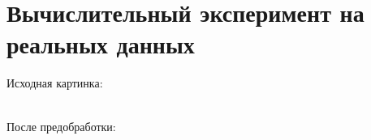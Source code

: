\section{Вычислительный эксперимент на реальных данных}
Исходная картинка: 
\begin{figure}[h]
\end{figure}\\
После предобработки: \\
\begin{figure}[h]
\end{figure}\\ \newpage
